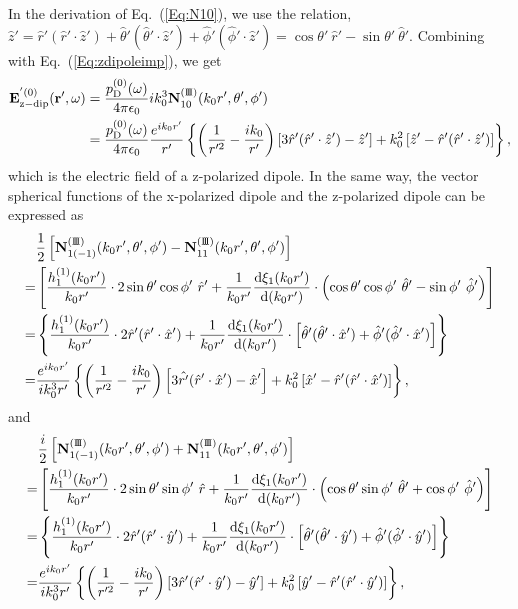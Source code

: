 \documentclass[journal=jacsat,manuscript=article,layout=traditional]{achemso}
\newcommand*\diff{\mathrm{d}}
\newcommand{\joinR}{\hspace{-.17em}}
\newcommand{\RomanI}{\scriptsize\textrm{I}}
\newcommand{\RomanIII}{\mbox{\RomanI\joinR\RomanI\joinR\RomanI}}
\begin{document}
In the derivation of Eq.~(\ref{Eq:N10}), we use the relation,
$\hat{z}'=\hat{r}'(\hat{r}'\cdot\hat{z}')+\hat{\theta}'(\hat{\theta}'\cdot\hat{z}')+\hat{\phi}'(\hat{\phi}'\cdot\hat{z}')=\cos\theta'~\hat{r}'-\sin\theta'~\hat{\theta}'$.
Combining with Eq.~(\ref{Eq:zdipoleimp}), we get
\begin{align}
    \nonumber
    \mathbf{E}_\mathrm{z-dip}^{'(0)}(\mathbf{r}',\omega)&=
    \frac{p_\mathrm{D}^{(0)}(\omega)}{4\pi\epsilon_0}ik_0^3\mathbf{N}_{\mathstrut{10}}^{(\RomanIII)}(k_0r',\theta',\phi')\\
    &=
    \frac{p_\mathrm{D}^{(0)}(\omega)}{4\pi\epsilon_0}
    \frac{e^{ik_0r'}}{r'}\left\{
    \left(\frac{1}{r'^2}-\frac{ik_0}{r'}\right)\left[3\hat{r}'(\hat{r}'\cdot\hat{z}')-\hat{z}'\right]+k_0^2\left[\hat{z}'-\hat{r}'(\hat{r}'\cdot\hat{z}')\right]
    \right\},
    \label{Eq:Edipolevac}
\end{align}
which is the electric field of a z-polarized dipole.
In the same way, the vector spherical functions of the x-polarized dipole and the z-polarized dipole can be expressed as
\begin{align}
    \nonumber
    &\frac{1}{2}\left[\mathbf{N}_{\mathstrut{1(-1)}}^{(\RomanIII)}(k_0r',\theta',\phi')-\mathbf{N}_{\mathstrut{11}}^{(\RomanIII)}(k_0r',\theta',\phi')\right]\\
    =&\left[
    \frac{h_1^{(1)}(k_0r')}{k_0r'}\cdot2\sin\theta'\cos\phi'~\hat{r}'+
    \frac{1}{k_0r'}\frac{\diff\xi_1(k_0r')}{\diff(k_0r')}\cdot\left(\cos\theta'\cos\phi'~\hat{\theta}'-\sin\phi'~\hat{\phi}'\right)\right]\\
    \nonumber
    =&\left\{
    \frac{h_1^{(1)}(k_0r')}{k_0r'}\cdot2\hat{r}'(\hat{r}'\cdot\hat{x}')+
    \frac{1}{k_0r'}\frac{\diff\xi_1(k_0r')}{\diff(k_0r')}\cdot
    \left[\hat{\theta}'(\hat{\theta}'\cdot\hat{x}')+\hat{\phi}'(\hat{\phi}'\cdot\hat{x}')\right]\right\}\\
    \label{Eq:N11-}
    =&
    \frac{e^{ik_0r'}}{ik_0^3r'}\left\{\left(\frac{1}{r'^2}-\frac{ik_0}{r'}\right)
    \left[3\hat{r'}(\hat{r}'\cdot\hat{x}')-\hat{x}'\right]+k_0^2
    \left[\hat{x}'-\hat{r}'(\hat{r}'\cdot\hat{x}')\right]\right\},
\end{align}
and 
\begin{align}
    \nonumber
    &\frac{i}{2}\left[\mathbf{N}_{\mathstrut{1(-1)}}^{(\RomanIII)}(k_0r',\theta',\phi')+\mathbf{N}_{\mathstrut{11}}^{(\RomanIII)}(k_0r',\theta',\phi')\right]\\
    =&\left[
    \frac{h_1^{(1)}(k_0r')}{k_0r'}\cdot2\sin\theta'\sin\phi'~\hat{r}+
    \frac{1}{k_0r'}\frac{\diff\xi_1(k_0r')}{\diff(k_0r')}\cdot\left(\cos\theta'\sin\phi'~\hat{\theta}'+\cos\phi'~\hat{\phi}'\right)\right]\\
    \nonumber
    =&\left\{
    \frac{h_1^{(1)}(k_0r')}{k_0r'}\cdot2\hat{r}'(\hat{r}'\cdot\hat{y}')+
    \frac{1}{k_0r'}\frac{\diff\xi_1(k_0r')}{\diff(k_0r')}\cdot
    \left[\hat{\theta}'(\hat{\theta}'\cdot\hat{y}')+\hat{\phi}'(\hat{\phi}'\cdot\hat{y}')\right]\right\}\\
    \label{Eq:N11+}
    =&
    \frac{e^{ik_0r'}}{ik_0^3r'}\left\{\left(\frac{1}{r'^2}-\frac{ik_0}{r'}\right)
    \left[3\hat{r}'(\hat{r}'\cdot\hat{y}')-\hat{y}'\right]+k_0^2
    \left[\hat{y}'-\hat{r}'(\hat{r}'\cdot\hat{y}')\right]\right\},
\end{align}
\end{document}
